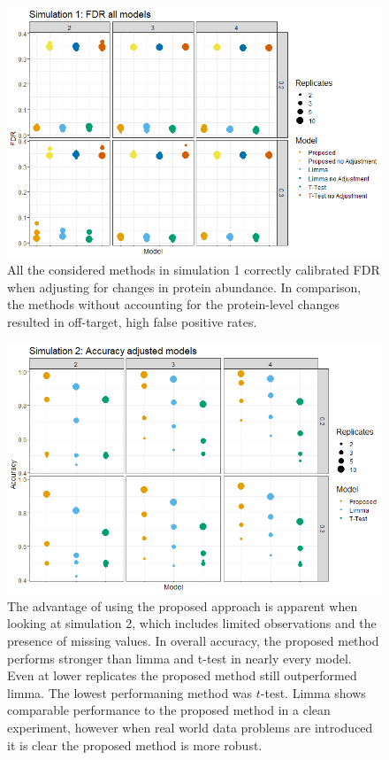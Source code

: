 \documentclass[mcp]{article}
\numberwithin{figure}{section} %
\numberwithin{table}{section}
\begin{document}
\begin{figure}[ht]
\centering
\includegraphics[width=1\textwidth]{images/sim1_FDR_all_models.png}
\caption{All the considered methods in simulation 1 correctly calibrated FDR when adjusting for changes in protein abundance. In comparison, the methods without accounting for the protein-level changes resulted in off-target, high false positive rates.
}\label{fig:fdr_all_models}
\end{figure}

\begin{figure}[ht]
\centering
\includegraphics[width=1\textwidth]{images/sim3_Accuracy.png}
\caption{The advantage of using the proposed approach is apparent when looking at simulation 2, which includes limited observations and the presence of missing values. In overall accuracy, the proposed method performs stronger than limma and t-test in nearly every model. Even at lower replicates the proposed method still outperformed limma. The lowest performaning method was $t$-test. Limma shows comparable performance to the proposed method in a clean experiment, however when real world data problems are introduced it is clear the proposed method is more robust.}
\label{fig:sim_accuracy}
\end{figure}
\end{document}
